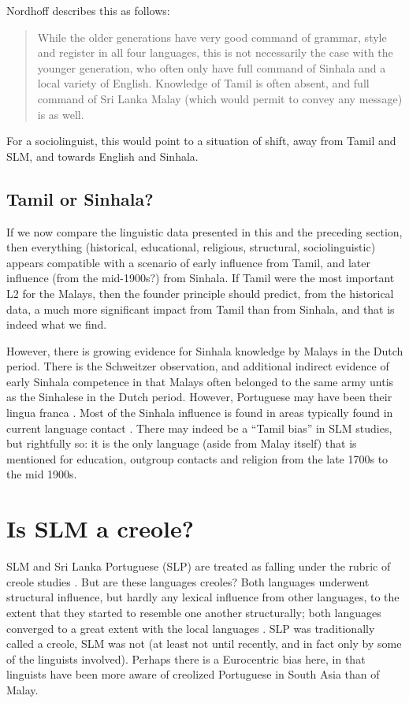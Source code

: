 Nordhoff describes this as follows:

\begin{quote}
While the older generations have very good command of grammar, style and register in all four languages, this is not necessarily the case with the younger generation, who often only have full command of Sinhala and a local variety of English. Knowledge of Tamil is often absent, and full command of Sri Lanka Malay (which would permit to convey any message) is as well. \citep[32]{Nordhoff2009}
\end{quote}

For a sociolinguist, this would point to a situation of shift, away from Tamil and SLM, and towards English and Sinhala.

\subsection{Tamil or Sinhala?}%
If we now compare the linguistic data presented in this and the preceding section, then everything (historical, educational, religious, structural, sociolinguistic) appears compatible with a scenario of early influence from Tamil, and later influence (from the mid-1900s?) from Sinhala. If Tamil were the most important L2 for the Malays, then the founder principle should predict, from the historical data, a much more significant impact from Tamil than from Sinhala, and that is indeed what we find. 

However, there is growing evidence for Sinhala knowledge by Malays in the Dutch period.
There is the Schweitzer observation, and additional indirect evidence of early Sinhala competence in that Malays often belonged to the same army untis as the Sinhalese in the Dutch period. 
However, Portuguese may have been their lingua franca \citep[346 and passim]{Baldaeus19581959}. Most of the Sinhala influence is found in areas typically found in current language contact \citep[cf.][]{Matras2009}. There may indeed be a ``Tamil bias'' in SLM studies, but rightfully so: it is the only language (aside from Malay itself) that is mentioned for education, outgroup contacts and religion from the late 1700s to the mid 1900s.


\section{Is SLM a creole?}\label{bakker:sec:5}
SLM and Sri Lanka Portuguese (SLP) are treated as falling under the rubric of creole studies \citep{Nordhofftvintro}. But are these languages creoles? Both languages underwent structural influence, but hardly any lexical influence from other languages, to the extent that they started to resemble one another structurally; both languages converged to a great extent with the local languages \citep[cf.][]{Bakker2006}. SLP was traditionally called a creole, SLM was not (at least not until recently, and in fact only by some of the linguists involved). Perhaps there is a Eurocentric bias here, in that linguists have been more aware of creolized Portuguese in South Asia than of Malay. 

